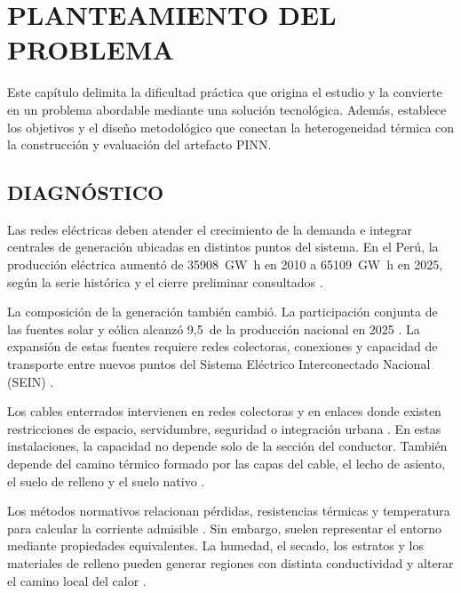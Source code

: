 \chapter{PLANTEAMIENTO DEL PROBLEMA}
\label{ch:planteamiento}
\thispagestyle{empty}

Este capítulo delimita la dificultad práctica que origina el estudio y la convierte en un problema abordable mediante una solución tecnológica. Además, establece los objetivos y el diseño metodológico que conectan la heterogeneidad térmica con la construcción y evaluación del artefacto PINN.

\section{DIAGNÓSTICO}
\label{sec:diagnostico}

Las redes eléctricas deben atender el crecimiento de la demanda e integrar centrales de generación ubicadas en distintos puntos del sistema. En el Perú, la producción eléctrica aumentó de \SI{35908}{\giga\watt\hour} en 2010 a \SI{65109}{\giga\watt\hour} en 2025, según la serie histórica y el cierre preliminar consultados \parencites[sec.~10.4]{minem2025anuario2024}[cuadro~4]{minem2025indicadoresDiciembre}.

La composición de la generación también cambió. La participación conjunta de las fuentes solar y eólica alcanzó 9,5\,\pct{} de la producción nacional en 2025 \parencite[cuadro~4]{minem2025indicadoresDiciembre}. La expansión de estas fuentes requiere redes colectoras, conexiones y capacidad de transporte entre nuevos puntos del Sistema Eléctrico Interconectado Nacional (SEIN) \parencites{coes2023diagnostico2025_2034}{iea2025transmissiongrid}.

Los cables enterrados intervienen en redes colectoras y en enlaces donde existen restricciones de espacio, servidumbre, seguridad o integración urbana \parencite{cigre2023overheadLines}. En estas instalaciones, la capacidad no depende solo de la sección del conductor. También depende del camino térmico formado por las capas del cable, el lecho de asiento, el suelo de relleno y el suelo nativo \parencites{enescu2020}{enescu2021}.

Los métodos normativos relacionan pérdidas, resistencias térmicas y temperatura para calcular la corriente admisible \parencites{neher1957}{iec60287}{iec60853}. Sin embargo, suelen representar el entorno mediante propiedades equivalentes. La humedad, el secado, los estratos y los materiales de relleno pueden generar regiones con distinta conductividad y alterar el camino local del calor \parencites[4--6]{enescu2021}[1--3]{aldulaimi2024}.

